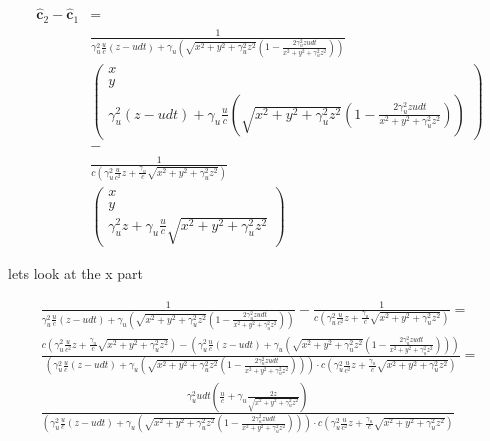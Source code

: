 \begin{equation}
	\begin{aligned}
	\mathbf{\hat{c}}_2 - \mathbf{\hat{c}}_1 &= \\
	& \frac{1}{ \gamma_u^2 \frac{u}{c} (z - u dt) + \gamma_u \left( \sqrt{x^2 + y^2 + \gamma_u^2 z^2} (1 - \frac{2\gamma_u^2 z u dt}{x^2 + y^2 + \gamma_u^2 z^2})  \right) } \\
	&
	\begin{pmatrix}
		x \\
		y \\
		\gamma_u^2 (z - u dt) + \gamma_u \frac{u}{c} \left( \sqrt{x^2 + y^2 + \gamma_u^2 z^2} (1 - \frac{2\gamma_u^2 z u dt}{x^2 + y^2 + \gamma_u^2 z^2})  \right)
	\end{pmatrix} \\
	&- \\
	&\frac{1}{c \left( \gamma_u^2 \frac{u}{c^2}z + \frac{\gamma_u}{c} \sqrt{x^2 + y^2 + \gamma_u^2 z^2} \right)} \\
	&
	\begin{pmatrix}
		x \\
		y \\
		\gamma_u^2 z + \gamma_u \frac{u}{c} \sqrt{x^2 + y^2 + \gamma_u^2 z^2}
	\end{pmatrix}
	\end{aligned}
\end{equation}

lets look at the x part

\begin{equation}
	\begin{aligned}
	\frac{1}{ \gamma_u^2 \frac{u}{c} (z - u dt) + \gamma_u \left( \sqrt{x^2 + y^2 + \gamma_u^2 z^2} (1 - \frac{2\gamma_u^2 z u dt}{x^2 + y^2 + \gamma_u^2 z^2})  \right) } - \frac{1}{c \left( \gamma_u^2 \frac{u}{c^2}z + \frac{\gamma_u}{c} \sqrt{x^2 + y^2 + \gamma_u^2 z^2} \right)} =
	\\
	\frac{c \left( \gamma_u^2 \frac{u}{c^2}z + \frac{\gamma_u}{c} \sqrt{x^2 + y^2 + \gamma_u^2 z^2} \right) - \left( \gamma_u^2 \frac{u}{c} (z - u dt) + \gamma_u \left( \sqrt{x^2 + y^2 + \gamma_u^2 z^2} (1 - \frac{2\gamma_u^2 z u dt}{x^2 + y^2 + \gamma_u^2 z^2})  \right)  \right) }{ \left( \gamma_u^2 \frac{u}{c} (z - u dt) + \gamma_u \left( \sqrt{x^2 + y^2 + \gamma_u^2 z^2} (1 - \frac{2\gamma_u^2 z u dt}{x^2 + y^2 + \gamma_u^2 z^2})  \right) \right) \cdot c \left( \gamma_u^2 \frac{u}{c^2}z + \frac{\gamma_u}{c} \sqrt{x^2 + y^2 + \gamma_u^2 z^2} \right)} =
	\\
	\frac{    \gamma_u^2  u dt \left ( \frac{u}{c}  + \gamma_u  \frac{ 2z }{\sqrt{x^2 + y^2 + \gamma_u^2 z^2}}   \right ) }{ \left( \gamma_u^2 \frac{u}{c} (z - u dt) + \gamma_u \left( \sqrt{x^2 + y^2 + \gamma_u^2 z^2} (1 - \frac{2\gamma_u^2 z u dt}{x^2 + y^2 + \gamma_u^2 z^2})  \right) \right) \cdot c \left( \gamma_u^2 \frac{u}{c^2}z + \frac{\gamma_u}{c} \sqrt{x^2 + y^2 + \gamma_u^2 z^2} \right)}
	\end{aligned}
\end{equation}

